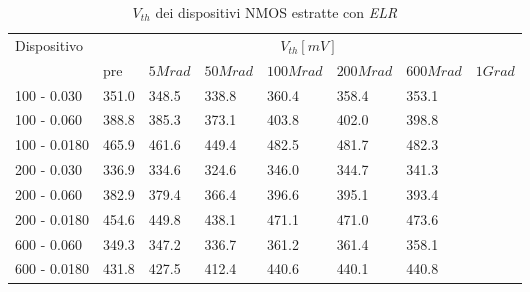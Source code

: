 \documentclass[
	a4paper,
	cleardoublepage=empty,
	headings=twolinechapter,
	numbers=autoenddot,
]{scrbook}
\begin{document}
\begin{table}[H]
  \renewcommand{\arraystretch}{1.3}
  \begin{tabular}{m{2.1cm} m{0.8cm} m{1.1cm} m{1.3cm} m{1.5cm} m{1.5cm} m{1.5cm} m{1cm}}
    \toprule
    \multirow{2}{*}{Dispositivo} & \multicolumn{7}{c}{$V_{th} [mV] $}                                                                    \\
    \cmidrule{2-8}
                                 & pre                                & $5Mrad$ & $50Mrad$ & $100Mrad$ & $200Mrad$ & $600Mrad$ & $1Grad$ \\
    \midrule
    100 - 0.030                     & 351.0                              & 348.5   & 338.8    & 360.4     & 358.4     & 353.1     &         \\
    \hline
    100 - 0.060                     & 388.8                              & 385.3   & 373.1    & 403.8     & 402.0     & 398.8     &         \\
    \hline
    100 - 0.0180                    & 465.9                              & 461.6   & 449.4    & 482.5     & 481.7     & 482.3     &         \\
    \hline
    200 - 0.030                     & 336.9                              & 334.6   & 324.6    & 346.0     & 344.7     & 341.3     &         \\
    \hline
    200 - 0.060                     & 382.9                              & 379.4   & 366.4    & 396.6     & 395.1     & 393.4     &         \\
    \hline
    200 - 0.0180                    & 454.6                              & 449.8   & 438.1    & 471.1     & 471.0     & 473.6     &         \\
    \hline
    600 - 0.060                     & 349.3                              & 347.2   & 336.7    & 361.2     & 361.4     & 358.1     &         \\
    \hline
    600 - 0.0180                    & 431.8                              & 427.5   & 412.4    & 440.6     & 440.1     & 440.8     &         \\
    \bottomrule
  \end{tabular}
  \caption{$V_{th}$ dei dispositivi NMOS estratte con \emph{ELR}}
  \label{tab:VthELRN}
\end{table}
\end{document}
